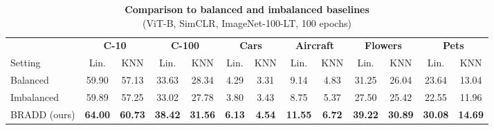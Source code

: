 \begin{table}[t]
\centering
\setlength{\tabcolsep}{2pt}
\caption{\centering \textbf{Comparison to balanced and imbalanced baselines}\\(ViT-B, SimCLR, ImageNet-100-LT, 100 epochs)}
{\begin{tabular}{l cc cc cc cc cc cc}
    \toprule
     & \multicolumn{2}{c}{\textbf{C-10}} &  \multicolumn{2}{c}{\textbf{C-100}}  &  \multicolumn{2}{c}{\textbf{Cars}} &  \multicolumn{2}{c}{\textbf{Aircraft}} &  \multicolumn{2}{c}{\textbf{Flowers}} &  \multicolumn{2}{c}{\textbf{Pets}} \\
     \cmidrule(r){2-3}
     \cmidrule(l){4-5}
     \cmidrule(l){6-7}
     \cmidrule(l){8-9}
     \cmidrule(l){10-11}
     \cmidrule(l){12-13}
    Setting & Lin. & KNN & Lin. & KNN & Lin. & KNN & Lin. & KNN & Lin. & KNN & Lin. & KNN \\
    \midrule
    
    \multirow{1}{*}{Balanced} & 59.90 & 57.13 & 33.63 & 28.34 & 4.29 & 3.31 & 9.14 & 4.83 & 31.25 & 26.04 & 23.64 & 13.04 \\
    \multirow{1}{*}{Imbalanced} & 59.89 & 57.25 & 33.02 & 27.78 & 3.80 & 3.43 & 8.75 & 5.37 & 27.50 & 25.42 & 22.55 & 11.96 \\
    \multirow{1}{*}{BRADD (ours)} & \textbf{64.00} & \textbf{60.73} & \textbf{38.42} & \textbf{31.56} & \textbf{6.13} & \textbf{4.54} & \textbf{11.55} & \textbf{6.72} & \textbf{39.22} & \textbf{30.89} & \textbf{30.08} & \textbf{14.69} \\
    \bottomrule
\end{tabular}
\label{table:baseline_comp}}
\end{table}
